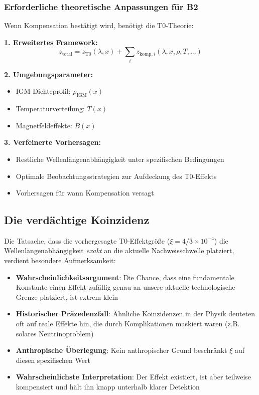 \documentclass[12pt,a4paper]{article}
\theoremstyle{definition}
\begin{document}
	\subsubsection{Erforderliche theoretische Anpassungen f\"ur B2}
	
	Wenn Kompensation best\"atigt wird, ben\"otigt die T0-Theorie:
	
	\textbf{1. Erweitertes Framework:}
	\begin{equation}
		z_{\text{total}} = z_{\text{T0}}(\lambda, x) + \sum_i z_{\text{komp},i}(\lambda, x, \rho, T, ...)
	\end{equation}
	
	\textbf{2. Umgebungsparameter:}
	\begin{itemize}
		\item IGM-Dichteprofil: $\rho_{\text{IGM}}(x)$
		\item Temperaturverteilung: $T(x)$
		\item Magnetfeldeffekte: $B(x)$
	\end{itemize}
	
	\textbf{3. Verfeinerte Vorhersagen:}
	\begin{itemize}
		\item Restliche Wellenl\"angenabh\"angigkeit unter spezifischen Bedingungen
		\item Optimale Beobachtungsstrategien zur Aufdeckung des T0-Effekts
		\item Vorhersagen f\"ur wann Kompensation versagt
	\end{itemize}
	
	\subsection{Die verd\"achtige Koinzidenz}
	
	Die Tatsache, dass die vorhergesagte T0-Effektgr\"o\ss{}e ($\xi = 4/3 \times 10^{-4}$) die Wellenl\"angenabh\"angigkeit \textit{exakt} an die aktuelle Nachweisschwelle platziert, verdient besondere Aufmerksamkeit:
	
	\begin{itemize}
		\item \textbf{Wahrscheinlichkeitsargument}: Die Chance, dass eine fundamentale Konstante einen Effekt zuf\"allig genau an unsere aktuelle technologische Grenze platziert, ist extrem klein
		\item \textbf{Historischer Pr\"azedenzfall}: \"Ahnliche Koinzidenzen in der Physik deuteten oft auf reale Effekte hin, die durch Komplikationen maskiert waren (z.B. solares Neutrinoproblem)
		\item \textbf{Anthropische \"Uberlegung}: Kein anthropischer Grund beschr\"ankt $\xi$ auf diesen spezifischen Wert
		\item \textbf{Wahrscheinlichste Interpretation}: Der Effekt existiert, ist aber teilweise kompensiert und h\"alt ihn knapp unterhalb klarer Detektion
	\end{itemize}
	
\end{document}
